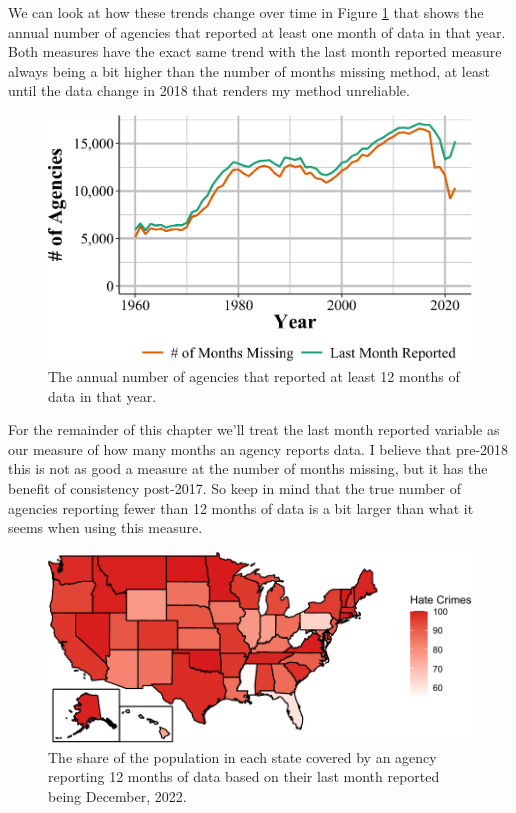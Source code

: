 \documentclass[
  12pt,
  openany]{book}
\begin{document}
We can look at how these trends change over time in Figure \ref{fig:countyAnyMonthReported} that shows the annual number of agencies that reported at least one month of data in that year. Both measures have the exact same trend with the last month reported measure always being a bit higher than the number of months missing method, at least until the data change in 2018 that renders my method unreliable.

\begin{figure}

{\centering \includegraphics[width=0.9\linewidth]{10_ucr_county_files/figure-latex/countyAnyMonthReported-1} 

}

\caption{The annual number of agencies that reported at least 12 months of data in that year.}\label{fig:countyAnyMonthReported}
\end{figure}

For the remainder of this chapter we'll treat the last month reported variable as our measure of how many months an agency reports data. I believe that pre-2018 this is not as good a measure at the number of months missing, but it has the benefit of consistency post-2017. So keep in mind that the true number of agencies reporting fewer than 12 months of data is a bit larger than what it seems when using this measure.

\begin{figure}

{\centering \includegraphics[width=0.9\linewidth]{10_ucr_county_files/figure-latex/stateMap2022-1} 

}

\caption{The share of the population in each state covered by an agency reporting 12 months of data based on their last month reported being December, 2022.}\label{fig:stateMap2022}
\end{figure}
\end{document}
